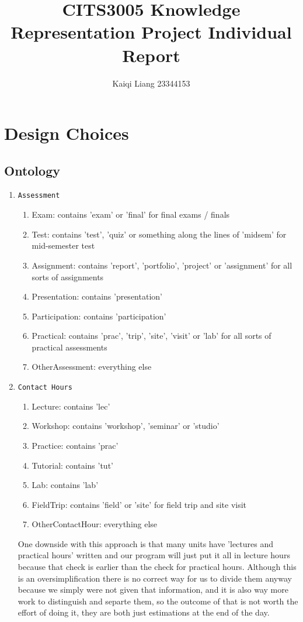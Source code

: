 \documentclass{article}
\begin{document}
\title{CITS3005 Knowledge Representation Project Individual Report}
\author{Kaiqi Liang 23344153}
\maketitle
\section*{Design Choices}
\subsection*{Ontology}
\begin{enumerate}
	\item \verb|Assessment|\begin{enumerate}
		\item Exam: contains 'exam' or 'final' for final exams / finals
		\item Test: contains 'test', 'quiz' or something along the lines of 'midsem' for mid-semester test
		\item Assignment: contains 'report', 'portfolio', 'project' or 'assignment' for all sorts of assignments
		\item Presentation: contains 'presentation'
		\item Participation: contains 'participation'
		\item Practical: contains 'prac', 'trip', 'site', 'visit' or 'lab' for all sorts of practical assessments
		\item OtherAssessment: everything else
	\end{enumerate}
	\item \verb|Contact Hours|\begin{enumerate}
		\item Lecture: contains 'lec'
		\item Workshop: contains 'workshop', 'seminar' or 'studio'
		\item Practice: contains 'prac'
		\item Tutorial: contains 'tut'
		\item Lab: contains 'lab'
		\item FieldTrip: contains 'field' or 'site' for field trip and site visit
		\item OtherContactHour: everything else
	\end{enumerate}One downside with this approach is that many units have 'lectures and practical hours' written and our program will just put it all in lecture hours because that check is earlier than the check for practical hours. Although this is an oversimplification there is no correct way for us to divide them anyway because we simply were not given that information, and it is also way more work to distinguish and separte them, so the outcome of that is not worth the effort of doing it, they are both just estimations at the end of the day.

\end{enumerate}
\end{document}
